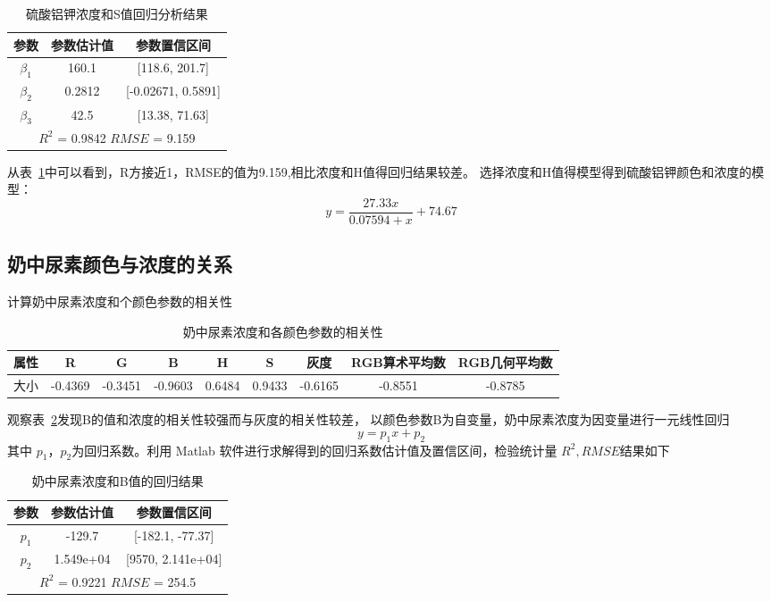     \begin{table}[H]
      \centering
      \caption{硫酸铝钾浓度和S值回归分析结果}
      \label{硫酸铝钾浓度和S值}
      \begin{tabular}{@{}ccc@{}}
      \toprule
      参数        & 参数估计值      & 参数置信区间                   \\ \midrule
      $\beta_1$     & 160.1     & {[}118.6, 201.7{]}     \\
      $\beta_2$     & 0.2812   & {[}-0.02671, 0.5891{]}    \\
      $\beta_3$     & 42.5     & {[}13.38, 71.63{]}         \\
      \hline
      \multicolumn{3}{c}{$R^2$ = 0.9842   $RMSE$ = 9.159} \\ \bottomrule
      \end{tabular}
    \end{table}
    
    从表~\ref{硫酸铝钾浓度和S值}中可以看到，R方接近1，RMSE的值为9.159,相比浓度和H值得回归结果较差。
    选择浓度和H值得模型得到硫酸铝钾颜色和浓度的模型：
    $$y=\frac{27.33x}{0.07594+x}+74.67$$
    \subsection{奶中尿素颜色与浓度的关系}
    计算奶中尿素浓度和个颜色参数的相关性
    
    \begin{table}[H]
      \centering
      \caption{奶中尿素浓度和各颜色参数的相关性}
      \label{奶中尿素浓度相关性}
      \begin{tabular}{@{}ccccccccc@{}}
      \toprule
      属性 & R  & G & B & H & S&灰度 & RGB算术平均数 & RGB几何平均数\\ \midrule
      大小 & -0.4369 & -0.3451  &-0.9603 & 0.6484 &0.9433 & -0.6165 & -0.8551 & -0.8785\\ \bottomrule
      \end{tabular}
    \end{table}
    
    观察表~\ref{奶中尿素浓度相关性}发现B的值和浓度的相关性较强而与灰度的相关性较差，
    以颜色参数B为自变量，奶中尿素浓度为因变量进行一元线性回归
    $$ y = p_1 x + p_2$$
    其中 $p_1，p_2$为回归系数。利用 Matlab 软件进行求解得到的回归系数估计值及置信区间，检验统计量 $R^2, RMSE $结果如下
    
    \begin{table}[H]
      \centering
      \caption{奶中尿素浓度和B值的回归结果}
      \label{奶中尿素和B值回归}
      \begin{tabular}{@{}ccc@{}}
      \toprule
      参数       & 参数估计值      & 参数置信区间                   \\ \midrule
      $p_1$     & -129.7     & {[}-182.1, -77.37{]}     \\
      $p_2$     & 1.549e+04   & {[}9570, 2.141e+04{]}    \\
      \hline
      \multicolumn{3}{c}{$R^2$ = 0.9221   $RMSE$ = 254.5} \\ \bottomrule
      \end{tabular}
    \end{table}
    
